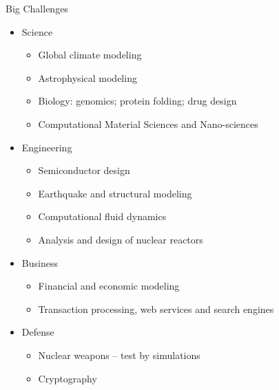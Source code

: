 \documentclass[xcolor=x11names,compress]{beamer}
\renewcommand{\(}{\begin{columns}}
\renewcommand{\)}{\end{columns}}
\newcommand{\<}[1]{\begin{column}{#1}}
\renewcommand{\>}{\end{column}}
\begin{document}
\begin{frame}{Big Challenges}
\begin{itemize}
\item Science
\begin{itemize}
\item Global climate modeling
\item Astrophysical modeling
\item Biology: genomics; protein folding; drug design
\item \alert{Computational Material Sciences} and Nano-sciences
\end{itemize}
\item Engineering
\begin{itemize}
\item Semiconductor design
\item Earthquake and structural modeling
\item \alert{Computational fluid dynamics} 
\item Analysis and design of \alert{nuclear reactors}
\end{itemize}
\item Business
\begin{itemize}
\item Financial and economic modeling
\item Transaction processing, web services and search engines
\end{itemize}
\item Defense
\begin{itemize}
\item Nuclear weapons -- test by simulations
\item Cryptography
\end{itemize}
\end{itemize}
\end{frame}

\end{document}

